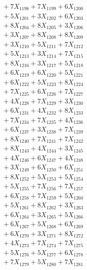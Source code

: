 \documentclass[a4paper,10pt]{article}
\begin{document}
{\begin{align}
&\;  + 7 X_{1198} + 7 X_{1199} + 6 X_{1200} \\[0.3ex]
&\;  + 5 X_{1201} + 3 X_{1202} + 6 X_{1203} \\[0.3ex]
&\;  + 8 X_{1204} + 8 X_{1205} + 3 X_{1206} \\[0.3ex]
&\;  + 3 X_{1207} + 8 X_{1208} + 8 X_{1209} \\[0.5ex]\allowbreak
&\;  + 3 X_{1210} + 5 X_{1211} + 7 X_{1212} \\[0.3ex]
&\;  + 5 X_{1213} + 3 X_{1214} + 7 X_{1215} \\[0.3ex]
&\;  + 8 X_{1216} + 3 X_{1217} + 5 X_{1218} \\[0.3ex]
&\;  + 6 X_{1219} + 6 X_{1220} + 5 X_{1221} \\[0.3ex]
&\;  + 6 X_{1222} + 5 X_{1223} + 8 X_{1224} \\[0.3ex]
&\;  + 7 X_{1225} + 6 X_{1226} + 7 X_{1227} \\[0.3ex]
&\;  + 4 X_{1228} + 7 X_{1229} + 3 X_{1230} \\[0.3ex]
&\;  + 6 X_{1231} + 4 X_{1232} + 8 X_{1233} \\[0.3ex]
&\;  + 7 X_{1234} + 7 X_{1235} + 4 X_{1236} \\[0.3ex]
&\;  + 6 X_{1237} + 3 X_{1238} + 7 X_{1239} \\[0.5ex]\allowbreak
&\;  + 8 X_{1240} + 7 X_{1241} + 7 X_{1242} \\[0.3ex]
&\;  + 8 X_{1243} + 4 X_{1244} + 3 X_{1245} \\[0.3ex]
&\;  + 4 X_{1246} + 6 X_{1247} + 4 X_{1248} \\[0.3ex]
&\;  + 3 X_{1249} + 6 X_{1250} + 6 X_{1251} \\[0.3ex]
&\;  + 8 X_{1252} + 5 X_{1253} + 5 X_{1254} \\[0.3ex]
&\;  + 5 X_{1255} + 7 X_{1256} + 7 X_{1257} \\[0.3ex]
&\;  + 6 X_{1258} + 7 X_{1259} + 5 X_{1260} \\[0.3ex]
&\;  + 5 X_{1261} + 8 X_{1262} + 3 X_{1263} \\[0.3ex]
&\;  + 6 X_{1264} + 3 X_{1265} + 5 X_{1266} \\[0.3ex]
&\;  + 6 X_{1267} + 5 X_{1268} + 6 X_{1269} \\[0.5ex]\allowbreak
&\;  + 6 X_{1270} + 3 X_{1271} + 8 X_{1272} \\[0.3ex]
&\;  + 4 X_{1273} + 7 X_{1274} + 7 X_{1275} \\[0.3ex]
&\;  + 5 X_{1276} + 5 X_{1277} + 6 X_{1278} \\[0.3ex]
&\;  + 7 X_{1279} + 5 X_{1280} + 7 X_{1281} \\[0.3ex]

\end{align}}
\end{document}
